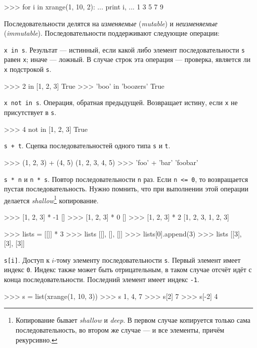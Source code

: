 \begin{pylst}{}{}
>>> for i in xrange(1, 10, 2):
...     print i,
...
1 3 5 7 9
\end{pylst}

Последовательности делятся на \emph{изменяемые} (\emph{mutable}) и \emph{неизменяемые} (\emph{immutable}). Последовательности поддерживают следующие операции:

\lstinline{x in s}. Результат — истинный, если какой либо элемент последовательности \lstinline{s} равен \lstinline{x}; иначе — ложный. В случае строк эта операция — проверка, является ли \lstinline{x} подстрокой \lstinline{s}.
\begin{pylst}{}{}
>>> 2 in [1, 2, 3]
True
>>> 'boo' in 'boozers'
True
\end{pylst}

\lstinline{x not in s}. Операция, обратная предыдущей. Возвращает истину, если \lstinline{x} не присутствует в \lstinline{s}.
\begin{pylst}{}{}
>>> 4 not in [1, 2, 3]
True
\end{pylst}

\lstinline{s + t}. Сцепка последовательностей одного типа \lstinline{s} и \lstinline{t}.
\begin{pylst}{}{}
>>> (1, 2, 3) + (4, 5)
(1, 2, 3, 4, 5)
>>> 'foo' + 'bar'
'foobar'
\end{pylst}

\lstinline{s * n} и \lstinline{n * s}. Повтор последовательности \lstinline{n} раз. Если \lstinline{n <= 0}, то возвращается пустая последовательность. Нужно помнить, что при выполнении этой операции делается \emph{shallow}\footnote{Копирование бывает \emph{shallow} и \emph{deep}. В первом случае копируется только сама последовательность, во втором же случае — и все элементы, причём рекурсивно.} копирование.
\begin{pylst}{}{}
>>> [1, 2, 3] * -1
[]
>>> [1, 2, 3] * 0
[]
>>> [1, 2, 3] * 2
[1, 2, 3, 1, 2, 3]

>>> lists = [[]] * 3
>>> lists
[[], [], []]
>>> lists[0].append(3)
>>> lists
[[3], [3], [3]]
\end{pylst}

\lstinline{s[i]}. Доступ к $i$-тому элементу последовательности \lstinline{s}. Первый элемент имеет индекс \lstinline{0}. Индекс также может быть отрицательным, в таком случае отсчёт идёт с конца последовательности. Последний элемент имеет индекс \lstinline{-1}.
\begin{pylst}{}{}
>>> s = list(xrange(1, 10, 3))
>>> s
1, 4, 7
>>> s[2]
7
>>> s[-2]
4
\end{pylst}


